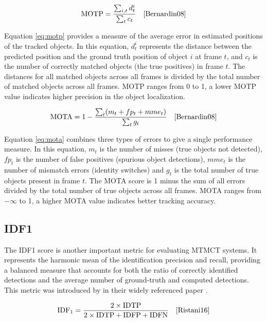 \begin{equation}
    \label{eq:motp}
    \text{MOTP}=\frac{\sum_{i, t} d_t^i}{\sum_t c_t}
    \quad\text{\cite[Eq.~1]{Bernardin08}}
\end{equation}

Equation \ref{eq:motp} provides a measure of the average error in estimated positions of the tracked objects. In this equation, \(d_t^i\) represents the distance between the predicted position and the ground truth position of object \(i\) at frame \(t\), and \(c_t\) is the number of correctly matched objects (the true positives) in frame \(t\). The distances for all matched objects across all frames is divided by the total number of matched objects across all frames. MOTP ranges from 0 to 1, a lower MOTP value indicates higher precision in the object localization.

\begin{equation}
    \label{eq:mota}
    \text{MOTA}=1-\frac{\sum_t (m_t+fp_t+mme_t)}{\sum_t g_t}
    \quad\text{\cite[Eq.~2]{Bernardin08}}
\end{equation}

Equation \ref{eq:mota} combines three types of errors to give a single performance measure. In this equation, \(m_t\) is the number of misses (true objects not detected), \(fp_t\) is the number of false positives (spurious object detections), \(mme_t\) is the number of mismatch errors (identity switches) and \(g_t\) is the total number of true objects present in frame \(t\). The MOTA score is 1 minus the sum of all errors divided by the total number of true objects across all frames. MOTA ranges from \(-\infty\) to 1, a higher MOTA value indicates better tracking accuracy.

\subsection{IDF1}\label{subsec:idf1}
The IDF1 score is another important metric for evaluating MTMCT systems. It represents the harmonic mean of the identification precision and recall, providing a balanced measure that accounts for both the ratio of correctly identified detections and the average number of ground-truth and computed detections. This metric was introduced by \citeauthor{Ristani16} in their widely referenced paper  \cite{Ristani16}.

\begin{equation}
    \label{eq:idf1}
    \text{IDF}_1 = \frac{2 \times \text{IDTP}}{2 \times \text{IDTP} + \text{IDFP} + \text{IDFN}}
    \quad\text{\cite[Eq.~11]{Ristani16}}
\end{equation}

